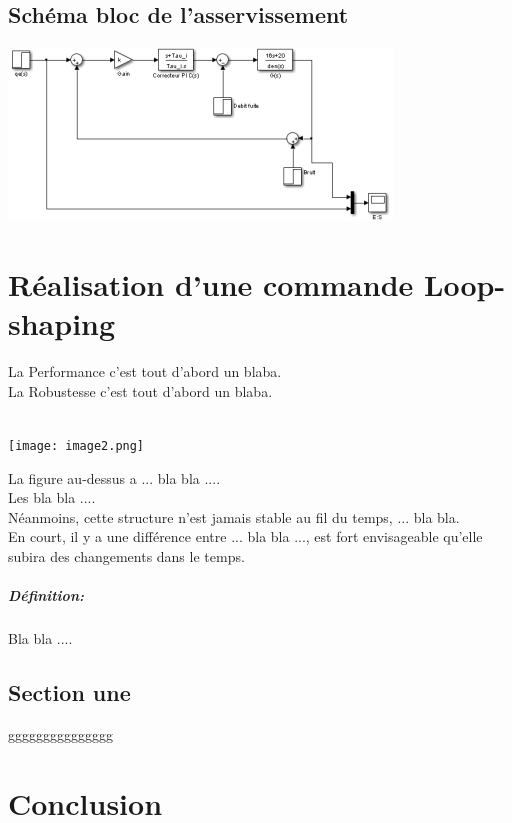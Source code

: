\documentclass[12pt, a4paper, openany]{report}
\begin{document}
 \section{Schéma bloc de l'asservissement} 
   \begin{center}
    \includegraphics[scale=1]{schemaBloc.png}
    \label{fig1}
   \end{center}
   
\chapter{Réalisation d'une commande Loop-shaping}
 La Performance c’est tout d’abord un blaba.\\
 
 La Robustesse c’est tout d’abord un blaba.\\ \\
 \begin{center}
   \texttt{[image: image2.png]}
   \label{fig2}
 \end{center}
 
 La figure au-dessus a ... bla bla ....\\
 
 Les bla bla ....\\
 
 Néanmoins, cette structure n’est jamais stable au fil du temps, ... bla bla.\\
  
 En court, il y a une différence entre ... bla bla ..., est fort envisageable qu’elle subira des changements dans le temps.
 
 \paragraph{Définition:}
  Bla bla ....

 \section{Section une}
  ggggggggggggggg



\chapter*{Conclusion}
\end{document}
